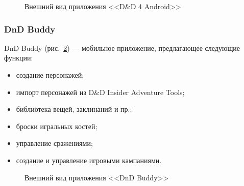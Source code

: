 \begin{figure}[!h]
\begin{minipage}[h]{0.49\linewidth}
\end{minipage}
\caption{Внешний вид приложения <<D\&D 4 Android>>}
\label{ris:dnd_4_android}
\end{figure}


\subsubsection{DnD Buddy}
DnD Buddy (рис.~\ref{ris:dnd_buddy}) --- мобильное приложение, предлагающее следующие функции:
\begin{itemize}
\item создание персонажей;
\item импорт персонажей из D\&D Insider Adventure Tools;
\item библиотека вещей, заклинаний и пр.;
\item броски игральных костей;
\item управление сражениями;
\item создание и управление игровыми кампаниями.
\end{itemize}

\begin{figure}[!h]
\caption{Внешний вид приложения <<DnD Buddy>>}
\label{ris:dnd_buddy}
\end{figure}


